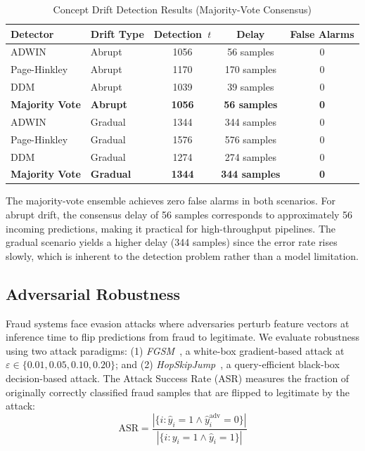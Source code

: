 \documentclass[journal]{IEEEtran}
\begin{document}
\begin{table}[!h]
\centering
\caption{Concept Drift Detection Results (Majority-Vote Consensus)}
\label{tab:drift}
\begin{tabular}{llccc}
\toprule
\textbf{Detector} & \textbf{Drift Type} & \textbf{Detection~$t$} & \textbf{Delay} & \textbf{False Alarms} \\
\midrule
ADWIN & Abrupt & 1056 & 56 samples & 0 \\
Page-Hinkley & Abrupt & 1170 & 170 samples & 0 \\
DDM & Abrupt & 1039 & 39 samples & 0 \\
\textbf{Majority Vote} & \textbf{Abrupt} & \textbf{1056} & \textbf{56 samples} & \textbf{0} \\
\midrule
ADWIN & Gradual & 1344 & 344 samples & 0 \\
Page-Hinkley & Gradual & 1576 & 576 samples & 0 \\
DDM & Gradual & 1274 & 274 samples & 0 \\
\textbf{Majority Vote} & \textbf{Gradual} & \textbf{1344} & \textbf{344 samples} & \textbf{0} \\
\bottomrule
\end{tabular}
\end{table}

The majority-vote ensemble achieves zero false alarms in both scenarios. For abrupt drift, the consensus delay of 56 samples corresponds to approximately 56 incoming predictions, making it practical for high-throughput pipelines. The gradual scenario yields a higher delay (344 samples) since the error rate rises slowly, which is inherent to the detection problem rather than a model limitation.

\subsection{Adversarial Robustness}
\label{sec:adversarial}
Fraud systems face evasion attacks where adversaries perturb feature vectors at inference time to flip predictions from fraud to legitimate. We evaluate robustness using two attack paradigms: (1) \emph{FGSM}~\cite{fgsm}, a white-box gradient-based attack at $\varepsilon \in \{0.01, 0.05, 0.10, 0.20\}$; and (2) \emph{HopSkipJump}~\cite{hopskipjump}, a query-efficient black-box decision-based attack. The Attack Success Rate (ASR) measures the fraction of originally correctly classified fraud samples that are flipped to legitimate by the attack:
\begin{equation}
\text{ASR} = \frac{|\{i : \hat{y}_i = 1 \wedge \hat{y}_i^{\text{adv}} = 0\}|}{|\{i : y_i = 1 \wedge \hat{y}_i = 1\}|}
\end{equation}
\end{document}
